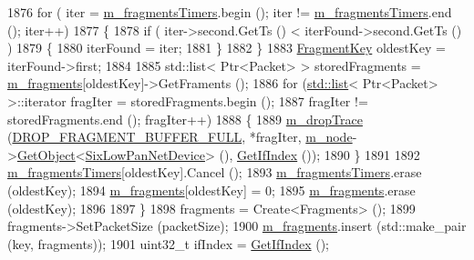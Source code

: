 \begin{DoxyCode}
1876           \textcolor{keywordflow}{for} ( iter = \hyperlink{classns3_1_1SixLowPanNetDevice_ac1f25bfd21a90f1419db0ecf1ea82547}{m\_fragmentsTimers}.begin (); iter != 
      \hyperlink{classns3_1_1SixLowPanNetDevice_ac1f25bfd21a90f1419db0ecf1ea82547}{m\_fragmentsTimers}.end (); iter++)
1877             \{
1878               \textcolor{keywordflow}{if} ( iter->second.GetTs () < iterFound->second.GetTs () )
1879                 \{
1880                   iterFound = iter;
1881                 \}
1882             \}
1883           \hyperlink{classns3_1_1SixLowPanNetDevice_a8e3be88fc6596428b23fb7b220f8e148}{FragmentKey} oldestKey = iterFound->first;
1884 
1885           std::list< Ptr<Packet> > storedFragments = \hyperlink{classns3_1_1SixLowPanNetDevice_aed9787c7dcee491945b752d0baa69d09}{m\_fragments}[oldestKey]->GetFraments ();
1886           \textcolor{keywordflow}{for} (\hyperlink{openflow-interface_8h_afd9bcfa176617760671b67580f536fa7}{std::list}< Ptr<Packet> >::iterator fragIter = storedFragments.begin ();
1887                fragIter != storedFragments.end (); fragIter++)
1888             \{
1889               \hyperlink{classns3_1_1SixLowPanNetDevice_a93e0ef7a17057bcb8420b8d37ec56356}{m\_dropTrace} (\hyperlink{classns3_1_1SixLowPanNetDevice_a70cec96e849d8504419dab1efd94fc05a90263f3641544e6ead204d6036b95160}{DROP\_FRAGMENT\_BUFFER\_FULL}, *fragIter, 
      \hyperlink{classns3_1_1SixLowPanNetDevice_a3f287ff63be440ab2978697b1d9b26a5}{m\_node}->\hyperlink{classns3_1_1Object_a13e18c00017096c8381eb651d5bd0783}{GetObject}<\hyperlink{classns3_1_1SixLowPanNetDevice_afb90a509d87f24373689a40f459d7ff6}{SixLowPanNetDevice}> (), 
      \hyperlink{classns3_1_1SixLowPanNetDevice_a48cd7b76a59b506df8d8a7d8604f66b3}{GetIfIndex} ());
1890             \}
1891 
1892           \hyperlink{classns3_1_1SixLowPanNetDevice_ac1f25bfd21a90f1419db0ecf1ea82547}{m\_fragmentsTimers}[oldestKey].Cancel ();
1893           \hyperlink{classns3_1_1SixLowPanNetDevice_ac1f25bfd21a90f1419db0ecf1ea82547}{m\_fragmentsTimers}.erase (oldestKey);
1894           \hyperlink{classns3_1_1SixLowPanNetDevice_aed9787c7dcee491945b752d0baa69d09}{m\_fragments}[oldestKey] = 0;
1895           \hyperlink{classns3_1_1SixLowPanNetDevice_aed9787c7dcee491945b752d0baa69d09}{m\_fragments}.erase (oldestKey);
1896 
1897         \}
1898       fragments = Create<Fragments> ();
1899       fragments->SetPacketSize (packetSize);
1900       \hyperlink{classns3_1_1SixLowPanNetDevice_aed9787c7dcee491945b752d0baa69d09}{m\_fragments}.insert (std::make\_pair (key, fragments));
1901       uint32\_t ifIndex = \hyperlink{classns3_1_1SixLowPanNetDevice_a48cd7b76a59b506df8d8a7d8604f66b3}{GetIfIndex} ();

\end{DoxyCode}
